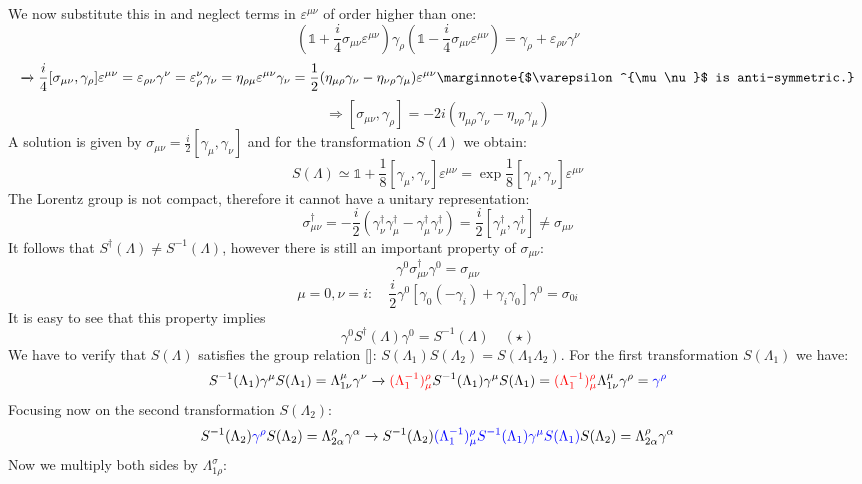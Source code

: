 \documentclass[../main.tex]{subfiles}
\begin{document}
We now substitute this in  and neglect terms in $\varepsilon^{\mu\nu}$ of order higher than one:
\[
\left(\mathbb{1}+\frac{i}{4}\sigma_{\mu\nu}\varepsilon^{\mu\nu}\right)\gamma_\rho\left(\mathbb{1}-\frac{i}{4}\sigma_{\mu\nu}\varepsilon^{\mu\nu}\right)=\gamma_\rho+\varepsilon_{\rho\nu}\gamma^\nu
\]
\[
\xrightarrow[]{}\frac{i}{4}[\sigma_{\mu\nu},\gamma_\rho]\varepsilon^{\mu\nu}=\varepsilon_{\rho\nu}\gamma^\nu=\varepsilon^\nu_\rho\gamma_\nu=\eta_{\rho\mu}\varepsilon^{\mu\nu}\gamma_\nu=\frac{1}{2}(\eta_{\mu\rho}\gamma_\nu-\eta_{\nu\rho}\gamma_\mu)\varepsilon^{\mu\nu}\marginnote{$\varepsilon^{\mu\nu}$ is anti-symmetric.}
\]
\[
\Rightarrow[\sigma_{\mu\nu},\gamma_\rho]=-2i(\eta_{\mu\rho}\gamma_\nu-\eta_{\nu\rho}\gamma_\mu)
\]
A solution is given by $\sigma_{\mu\nu}=\frac{i}{2}[\gamma_\mu,\gamma_\nu]$ and for the transformation $S(\Lambda)$ we obtain:
\[
S(\Lambda)\simeq\mathbb{1}+\frac{1}{8}[\gamma_\mu,\gamma_\nu]\varepsilon^{\mu\nu}=\exp{\frac{1}{8}[\gamma_\mu,\gamma_\nu]\varepsilon^{\mu\nu}}
\]
The Lorentz group is not compact, therefore it cannot have a unitary representation:
\[
\sigma^\dagger_{\mu\nu}=-\frac{i}{2}(\gamma^\dagger_\nu\gamma^\dagger_\mu-\gamma^\dagger_\mu\gamma^\dagger_\nu)=\frac{i}{2}[\gamma^\dagger_\mu,\gamma^\dagger_\nu]\neq\sigma_{\mu\nu}
\]
It follows that $S^\dagger(\Lambda)\neq S^{-1}(\Lambda)$, however there is still an important property of $\sigma_{\mu\nu}$: 
\[
\gamma^0\sigma^\dagger_{\mu\nu}\gamma^0=\sigma_{\mu\nu}
\]
\[
\mu=0,\nu=i: \quad \frac{i}{2}\gamma^0[\gamma_0(-\gamma_i)+\gamma_i\gamma_0]\gamma^0=\sigma_{0i}
\]
It is easy to see that this property implies 
\[
\gamma^0 S^\dagger(\Lambda)\gamma^0=S^{-1}(\Lambda) \quad (\star)
\]
We have to verify that $S(\Lambda)$ satisfies the group relation []: $S(\Lambda_1)S(\Lambda_2)=S(\Lambda_1\Lambda_2)$. For the first transformation $S(\Lambda_1)$ we have:
\[
S^{-1}(\Lambda_1)\gamma^\mu S(\Lambda_1)=\Lambda^\mu_{1\nu}\gamma^\nu\xrightarrow[]{}{\color{red}(\Lambda^{-1}_1)^\rho_\mu}S^{-1}(\Lambda_1)\gamma^\mu S(\Lambda_1)={\color{red}(\Lambda^{-1}_1)^\rho_\mu}\Lambda^\mu_{1\nu}\gamma^\rho={\color{blue}\gamma^\rho}
\]
Focusing now on the second transformation $S(\Lambda_2)$:
\[
S^{-1}(\Lambda_2){\color{blue}\gamma^\rho} S(\Lambda_2)=\Lambda^\rho_{2\alpha}\gamma^\alpha\xrightarrow[]{}S^{-1}(\Lambda_2){\color{blue}(\Lambda^{-1}_1)^\rho_\mu S^{-1}(\Lambda_1)\gamma^\mu S(\Lambda_1)}S(\Lambda_2)=\Lambda^\rho_{2\alpha}\gamma^\alpha
\]
Now we multiply both sides by $\Lambda^\sigma_{1\rho}$:
\end{document}

